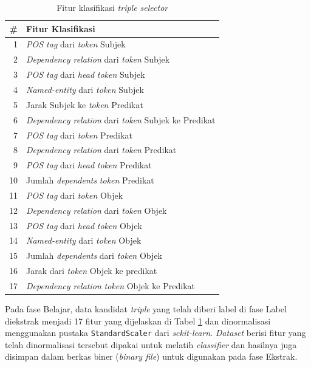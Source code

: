 \begin{table}
\caption{Fitur klasifikasi \textit{triple selector}}
\label{tab:models_features}
\centering
\begin{tabular}{r l}
\hline
\textbf{\#} & \textbf{Fitur Klasifikasi} \\
\hline
1 & \textit{POS tag} dari \textit{token} Subjek \\
2 & \textit{Dependency relation} dari \textit{token} Subjek \\
3 & \textit{POS tag} dari \textit{head} \textit{token} Subjek \\
4 & \textit{Named-entity} dari \textit{token} Subjek \\
5 & Jarak Subjek ke \textit{token} Predikat \\
6 & \textit{Dependency relation} dari \textit{token} Subjek ke Predikat \\
7 & \textit{POS tag} dari \textit{token} Predikat \\
8 & \textit{Dependency relation} dari \textit{token} Predikat \\
9 & \textit{POS tag} dari \textit{head} \textit{token} Predikat \\
10 & Jumlah \textit{dependents} \textit{token} Predikat \\
11 & \textit{POS tag} dari \textit{token} Objek \\
12 & \textit{Dependency relation} dari \textit{token} Objek \\
13 & \textit{POS tag} dari \textit{head} \textit{token} Objek \\
14 & \textit{Named-entity} dari \textit{token} Objek \\
15 & Jumlah \textit{dependents} dari \textit{token} Objek \\
16 & Jarak dari \textit{token} Objek ke predikat \\
17 & \textit{Dependency relation} \textit{token} Objek ke Predikat  \\
\end{tabular}
\end{table}

Pada fase Belajar, data kandidat \textit{triple} yang telah diberi label di fase Label diekstrak menjadi 17 fitur yang dijelaskan di Tabel \ref{tab:models_features} dan dinormalisasi menggunakan pustaka \verb|StandardScaler| dari \textit{sckit-learn}. \textit{Dataset} berisi fitur yang telah dinormalisasi tersebut dipakai untuk melatih \textit{classifier} dan hasilnya juga disimpan dalam berkas biner (\textit{binary file}) untuk digunakan pada fase Ekstrak.

